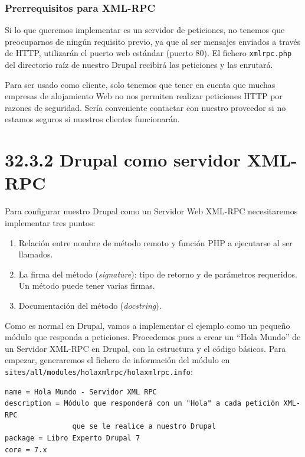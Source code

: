 \subsubsection{\large{Prerrequisitos para XML-RPC}}

Si lo que queremos implementar es un servidor de peticiones, no tenemos que preocuparnos de ningún requisito previo, ya 
que al ser mensajes enviados a través de HTTP, utilizarán el puerto web estándar (puerto 80). El fichero \verb|xmlrpc.php| 
del directorio raíz de nuestro Drupal recibirá las peticiones y las enrutará.

Para ser usado como cliente, solo tenemos que tener en cuenta que muchas empresas de alojamiento Web no nos permiten 
realizar peticiones HTTP por razones de seguridad. Sería conveniente contactar con nuestro proveedor si no estamos seguros 
si nuestros clientes funcionarán.

\section{\Large{32.3.2 Drupal como servidor XML-RPC}}

Para configurar nuestro Drupal como un Servidor Web XML-RPC necesitaremos implementar tres puntos:

\begin{enumerate}
  \item Relación entre nombre de método remoto y función PHP a ejecutarse al ser llamados.
  \item La firma del método (\textit{signature}): tipo de retorno y de parámetros requeridos. Un método puede tener varias firmas.
  \item Documentación del método (\textit{docstring}).
\end{enumerate}

Como es normal en Drupal, vamos a implementar el ejemplo como un pequeño módulo que responda a peticiones. Procedemos pues a 
crear un ``Hola Mundo'' de un Servidor XML-RPC en Drupal, con la estructura y el código básicos. Para empezar, generaremos el 
fichero de información del módulo en \verb|sites/all/modules/holaxmlrpc/holaxmlrpc.info|:

\begin{verbatim}
name = Hola Mundo - Servidor XML RPC
description = Módulo que responderá con un "Hola" a cada petición XML-RPC 
				que se le realice a nuestro Drupal
package = Libro Experto Drupal 7
core = 7.x 
\end{verbatim}

